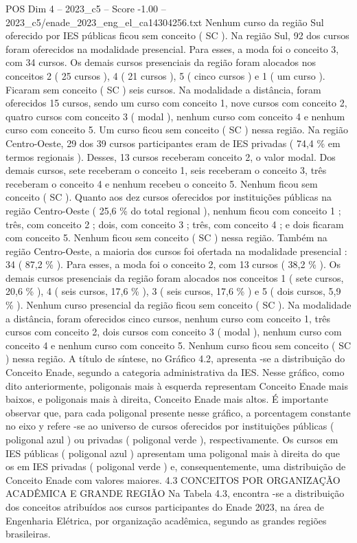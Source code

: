 \begin{textsample}{POS Dim 4 – 2023\_c5 – Score -1.00 – 2023\_c5/enade\_2023\_eng\_el\_ca14304256.txt}
Nenhum curso da região Sul oferecido por IES públicas ficou sem conceito ( SC ).
Na região Sul, 92 dos cursos foram oferecidos na modalidade presencial.
Para esses, a moda foi o conceito 3, com 34 cursos.
Os demais cursos presenciais da região foram alocados nos conceitos 2 ( 25 cursos ), 4 ( 21 cursos ), 5 ( cinco cursos ) e 1 ( um curso ).
Ficaram sem conceito ( SC ) seis cursos.
Na modalidade a distância, foram oferecidos 15 cursos, sendo um curso com conceito 1, nove cursos com conceito 2, quatro cursos com conceito 3 ( modal ), nenhum curso com conceito 4 e nenhum curso com conceito 5.
Um curso ficou sem conceito ( SC ) nessa região.
Na região Centro-Oeste, 29 dos 39 cursos participantes eram de IES privadas ( 74,4 \% em termos regionais ).
Desses, 13 cursos receberam conceito 2, o valor modal.
Dos demais cursos, sete receberam o conceito 1, seis receberam o conceito 3, três receberam o conceito 4 e nenhum recebeu o conceito 5.
Nenhum ficou sem conceito ( SC ).
Quanto aos dez cursos oferecidos por instituições públicas na região Centro-Oeste ( 25,6 \% do total regional ), nenhum ficou com conceito 1 ; três, com conceito 2 ; dois, com conceito 3 ; três, com conceito 4 ; e dois ficaram com conceito 5.
Nenhum ficou sem conceito ( SC ) nessa região.
Também na região Centro-Oeste, a maioria dos cursos foi ofertada na modalidade presencial : 34 ( 87,2 \% ).
Para esses, a moda foi o conceito 2, com 13 cursos ( 38,2 \% ).
Os demais cursos presenciais da região foram alocados nos conceitos 1 ( sete cursos, 20,6 \% ), 4 ( seis cursos, 17,6 \% ), 3 ( seis cursos, 17,6 \% ) e 5 ( dois cursos, 5,9 \% ).
Nenhum curso presencial da região ficou sem conceito ( SC ).
Na modalidade a distância, foram oferecidos cinco cursos, nenhum curso com conceito 1, três cursos com conceito 2, dois cursos com conceito 3 ( modal ), nenhum curso com conceito 4 e nenhum curso com conceito 5.
Nenhum curso ficou sem conceito ( SC ) nessa região.
A título de síntese, no Gráfico 4.2, apresenta -se a distribuição do Conceito Enade, segundo a categoria administrativa da IES.
Nesse gráfico, como dito anteriormente, poligonais mais à esquerda representam Conceito Enade mais baixos, e poligonais mais à direita, Conceito Enade mais altos.
É importante observar que, para cada poligonal presente nesse gráfico, a porcentagem constante no eixo y refere -se ao universo de cursos oferecidos por instituições públicas ( poligonal azul ) ou privadas ( poligonal verde ), respectivamente.
Os cursos em IES públicas ( poligonal azul ) apresentam uma poligonal mais à direita do que os em IES privadas ( poligonal verde ) e, consequentemente, uma distribuição de Conceito Enade com valores maiores. 4.3 CONCEITOS POR ORGANIZAÇÃO ACADÊMICA E GRANDE REGIÃO Na Tabela 4.3, encontra -se a distribuição dos conceitos atribuídos aos cursos participantes do Enade 2023, na área de Engenharia Elétrica, por organização acadêmica, segundo as grandes regiões brasileiras.

\end{textsample}

